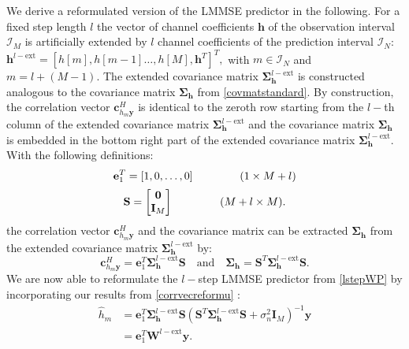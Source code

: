 \documentclass[12pt, draftclsnofoot, onecolumn]{IEEEtran}
\begin{document}
We derive a reformulated version of the LMMSE predictor in the following. For a fixed step length $l$ the vector of channel coefficients $\mathbf{h}$ of the observation interval $\mathcal{I}_M$ is artificially extended by $l$ channel coefficients of the prediction interval $\mathcal{I}_N$: $\mathbf{h}^{l-\text{ext}} = [{h[m]},{h[m-1]}\dots,{h[M]} ,\mathbf{h}^T]^T,$ with $m \in \mathcal{I}_N$ and $m = l+(M-1)$. The extended covariance matrix $\mathbf{\Sigma}_\mathbf{h}^{l-\text{ext}}$ is constructed analogous to the covariance matrix $\mathbf{\Sigma}_{\mathbf{h}}$ from \eqref{covmatstandard}.
By construction, the correlation vector $\mathbf{c}_{h_{m}\mathbf{y}}^{H}$ is identical to the zeroth row starting from the $l-$th column of the extended covariance matrix $\mathbf{\Sigma}_\mathbf{h}^{l-\text{ext}}$ and the covariance matrix $\mathbf{\Sigma}_{\mathbf{h}}$ is embedded in the bottom right part of the extended covariance matrix $\mathbf{\Sigma}_\mathbf{h}^{l-\text{ext}}$. With the following definitions:
\begin{equation}
       \mathbf{e}_1^T = [1,0, \dots, 0] \hspace{1.5cm} (1 \times M+l)
\end{equation}
\begin{equation}
       \mathbf{S} = 
       \begin{bmatrix}
        \mathbf{0} \\
        \mathbf{I}_M
\end{bmatrix} \hspace{1.5cm} (M+l \times M).
\end{equation}
the correlation vector $\mathbf{c}_{h_{m}\mathbf{y}}^{H}$ and the covariance matrix can be extracted $\mathbf{\Sigma}_{\mathbf{h}}$ from the extended covariance matrix $\mathbf{\Sigma}_\mathbf{h}^{l-\text{ext}}$ by:
\begin{equation}
       { \mathbf{c}_{h_{m}\mathbf{y}}^{H} } = \mathbf{e}_1^T \mathbf{\Sigma}_\mathbf{h}^{l-\text{ext}} \mathbf{S}
       \label{corrvecreformu} \quad \text{and} \quad 
       {\mathbf{\Sigma}_{\mathbf{h}}} = \mathbf{S}^T \mathbf{\Sigma}_\mathbf{h}^{l-\text{ext}} \mathbf{S}.
\end{equation}
We are now able to reformulate the $l-$step LMMSE predictor from \eqref{lstepWP} by incorporating our results from \eqref{corrvecreformu} \cite{turan2019learning}:
\begin{align}
    \hat{h}_m 
      & = \mathbf{e}_1^T \mathbf{\Sigma}_\mathbf{h}^{l-\text{ext}} \mathbf{S} (\mathbf{S}^T \mathbf{\Sigma}_\mathbf{h}^{l-\text{ext}} \mathbf{S} +  \sigma_n^2 \mathbf{I}_M)^{-1} \mathbf{y}
      \label{lstepWPreformu} \\
      & = \mathbf{e}_1^T\mathbf{W}^{l-\text{ext}}\mathbf{y}. 
      \label{lstepWPreformu2}
\end{align}
\end{document}
